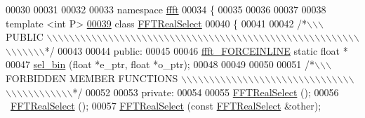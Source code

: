 \begin{DoxyCode}
00030 
00031 
00032 
00033 \textcolor{keyword}{namespace }\hyperlink{a00142}{ffft}
00034 \{
00035 
00036 
00037 
00038 \textcolor{keyword}{template} <\textcolor{keywordtype}{int} P>
\hypertarget{a00104_source_l00039}{}\hyperlink{a00015}{00039} \textcolor{keyword}{class }\hyperlink{a00015}{FFTRealSelect}
00040 \{
00041 
00042 \textcolor{comment}{/*\(\backslash\)\(\backslash\)\(\backslash\) PUBLIC \(\backslash\)\(\backslash\)\(\backslash\)\(\backslash\)\(\backslash\)\(\backslash\)\(\backslash\)\(\backslash\)\(\backslash\)\(\backslash\)\(\backslash\)\(\backslash\)\(\backslash\)\(\backslash\)\(\backslash\)\(\backslash\)\(\backslash\)\(\backslash\)\(\backslash\)\(\backslash\)\(\backslash\)\(\backslash\)\(\backslash\)\(\backslash\)\(\backslash\)\(\backslash\)\(\backslash\)\(\backslash\)\(\backslash\)\(\backslash\)\(\backslash\)\(\backslash\)\(\backslash\)\(\backslash\)\(\backslash\)\(\backslash\)\(\backslash\)\(\backslash\)\(\backslash\)\(\backslash\)\(\backslash\)\(\backslash\)\(\backslash\)\(\backslash\)\(\backslash\)\(\backslash\)\(\backslash\)\(\backslash\)\(\backslash\)\(\backslash\)\(\backslash\)\(\backslash\)\(\backslash\)\(\backslash\)\(\backslash\)\(\backslash\)\(\backslash\)\(\backslash\)\(\backslash\)\(\backslash\)\(\backslash\)\(\backslash\)\(\backslash\)*/}
00043 
00044 \textcolor{keyword}{public}:
00045 
00046     \hyperlink{a00089_a31b2ada863c9efa7455efae4e13661f3}{ffft\_FORCEINLINE} \textcolor{keyword}{static} \textcolor{keywordtype}{float} *
00047                         \hyperlink{a00015_a6659db9f9be1816f182d1c5988cd3859}{sel\_bin} (\textcolor{keywordtype}{float} *e\_ptr, \textcolor{keywordtype}{float} *o\_ptr);
00048 
00049 
00050 
00051 \textcolor{comment}{/*\(\backslash\)\(\backslash\)\(\backslash\) FORBIDDEN MEMBER FUNCTIONS \(\backslash\)\(\backslash\)\(\backslash\)\(\backslash\)\(\backslash\)\(\backslash\)\(\backslash\)\(\backslash\)\(\backslash\)\(\backslash\)\(\backslash\)\(\backslash\)\(\backslash\)\(\backslash\)\(\backslash\)\(\backslash\)\(\backslash\)\(\backslash\)\(\backslash\)\(\backslash\)\(\backslash\)\(\backslash\)\(\backslash\)\(\backslash\)\(\backslash\)\(\backslash\)\(\backslash\)\(\backslash\)\(\backslash\)\(\backslash\)\(\backslash\)\(\backslash\)\(\backslash\)\(\backslash\)\(\backslash\)\(\backslash\)\(\backslash\)\(\backslash\)\(\backslash\)\(\backslash\)\(\backslash\)\(\backslash\)\(\backslash\)*/}
00052 
00053 \textcolor{keyword}{private}:
00054 
00055                         \hyperlink{a00015}{FFTRealSelect} ();
00056                         ~\hyperlink{a00015}{FFTRealSelect} ();
00057                         \hyperlink{a00015}{FFTRealSelect} (\textcolor{keyword}{const} \hyperlink{a00015}{FFTRealSelect} &other);

\end{DoxyCode}
